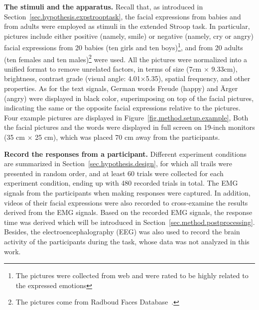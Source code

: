 \textbf{The stimuli and the apparatus.}
Recall that,  
as introduced in Section~\ref{sec.hypothesis.expstrooptask},
the facial expressions from babies and from adults were employed as stimuli
in the extended Stroop task.
In particular, 
pictures include 
either positive (namely, smile) or negative (namely, cry or angry) facial expressions from 20 babies (ten girls and ten boys)\footnote{The pictures were collected from web and were rated to be highly related to the expressed emotions},
and from 20 adults (ten females and ten males)\footnote{The pictures come 
from Radboud Faces Database~\cite{langner2010presentation}.} were used.
All the pictures were normalized into a unified format to remove unrelated factors,
in terms of 
size (7cm $\times$ 9.33cm),
brightness, contrast grade (visual angle: 4.01\textdegree $\times$5.35\textdegree),
spatial frequency, and other properties. 
As for the text signals, 
German words Freude (happy) and Ärger (angry) were displayed in black color, 
superimposing on top of the facial pictures, indicating the same or the opposite facial expressions relative to the pictures. Four example pictures are displayed in Figure~\ref{fig.method.setup.example}, 
Both the facial pictures and the words were displayed in full screen on 19-inch monitors (35 cm $\times$ 25 cm), which was placed 70 cm away from the participants. 


\textbf{Record the responses from a participant.}
Different experiment conditions are summarized in Section~\ref{sec.hypothesis.design},
for which all trails were presented in random order, 
and at least 60 trials were collected for each experiment condition, 
ending up with 480 recorded trials in total.
The EMG signals from the participants
when making responses were captured. In addition,
videos of their facial expressions 
were also recorded to cross-examine the results derived from the EMG signals.
Based on the recorded EMG signals,
the response time was derived which will be introduced in Section~\ref{sec.method.postprocessing}. Besides, the electroencephalography (EEG) was also used to record the brain activity of the participants during the task, whose data was not analyzed in this work.




